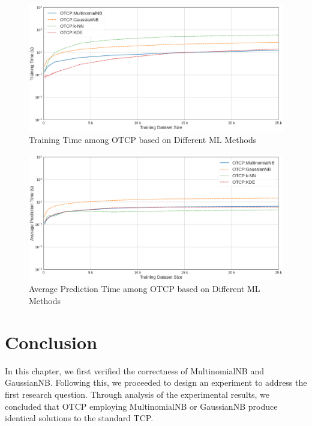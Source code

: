 \documentclass[10pt]{reportMaster}
\begin{document}
\begin{figure}[H]
    \centering
    \includegraphics[width = 13cm]{figures/TrainingTime_2.png}
    \caption{Training Time among OTCP based on Different ML Methods}
    \label{fig:TrainingTime_2}
\end{figure}

\begin{figure}[H]
    \centering
    \includegraphics[width = 13cm]{figures/AveragePredictionTime_2.png}
    \caption{Average Prediction Time among OTCP based on Different ML Methods}
    \label{fig:AveragePredictionTime_2}
\end{figure}

\section{Conclusion}

In this chapter, we first verified the correctness of MultinomialNB and GaussianNB. Following this, we proceeded to design an experiment to address the first research question. Through analysis of the experimental results, we concluded that OTCP employing MultinomialNB or GaussianNB produce identical solutions to the standard TCP.\\
\end{document}
